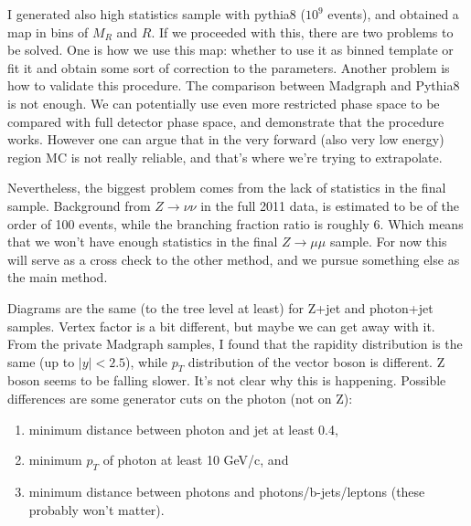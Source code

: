I generated also high statistics sample with {\sc pythia8} ($10^9$ events), and obtained a map in bins of $M_R$ and $R$.
If we proceeded with this, there are two problems to be solved.  One is how we use this map: whether to
use it as binned template or fit it and obtain some sort of correction to the parameters.
Another problem is how to validate this procedure.  The comparison between {\sc Madgraph} and
{\sc Pythia8} is not enough.  We can potentially use even more restricted phase space to be
compared with full detector phase space, and demonstrate that the procedure works.
However one can argue that in the very forward (also very low energy) region MC is not really reliable,
and that's where we're trying to extrapolate.

Nevertheless, the biggest problem comes from the lack of statistics in the final sample.
Background from $Z \rightarrow \nu\nu$ in the full 2011 data, is estimated to be of the order of
100 events, while the branching fraction ratio is roughly 6.  Which means that we won't have
enough statistics in the final $Z\rightarrow\mu\mu$ sample.
For now this will serve as a cross check to the other method, and we pursue something else
as the main method.



Diagrams are the same (to the tree level at least) for Z+jet and photon+jet samples.
Vertex factor is a bit different, but maybe we can get away with it.
From the private {\sc Madgraph} samples, I found that the rapidity distribution
is the same (up to $|y| < 2.5$), while $p_T$ distribution of the vector boson is different.
Z boson seems to be falling slower.  It's not clear why this is happening.
Possible differences are some generator cuts on the photon (not on Z):

\begin{enumerate}
\item minimum distance between photon and jet at least 0.4,
\item minimum $p_T$ of photon at least 10 GeV/c, and
\item minimum distance between photons and photons/b-jets/leptons (these probably won't matter).
\end{enumerate}


